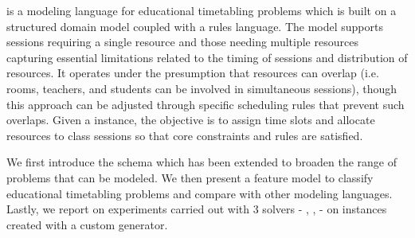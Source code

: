 {\UTP} is a modeling language for educational timetabling problems
%
which is built on a structured domain model coupled with a rules language.
The model supports sessions requiring a single resource 
and those needing multiple resources 
capturing essential limitations related to the timing of sessions and distribution of resources. 
It operates under the presumption that resources can overlap (i.e. rooms, teachers, and students can be involved in simultaneous sessions), though this approach can be adjusted through specific scheduling rules that prevent such overlaps. 
Given a \UTP{} instance, the objective is to assign time slots and allocate resources to class sessions so that core constraints and rules are satisfied.
%

We first introduce the {\UTP} schema which has been extended to broaden the range of problems that can be modeled. 
We then present a feature model to classify educational timetabling problems and compare \UTP{} with other modeling languages. 
Lastly, we report on experiments carried out with 3 \UTP{} solvers - {\CP}, {\ASP}, {\MIP} -
on instances created with a custom generator. %


